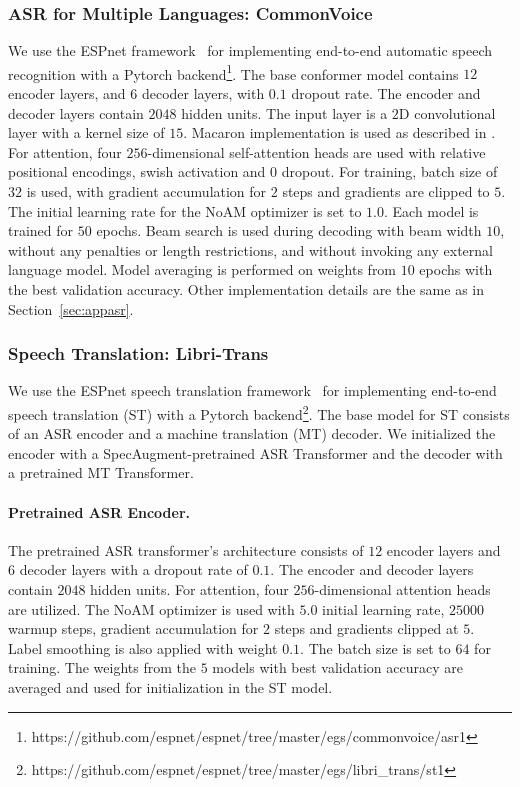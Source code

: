 \documentclass{article}
\begin{document}
\subsubsection{ASR for Multiple Languages: CommonVoice}
\label{sec:appcommon}
We use the ESPnet framework~\citep{espnet} for implementing end-to-end automatic speech recognition with a Pytorch backend\footnote{https://github.com/espnet/espnet/tree/master/egs/commonvoice/asr1}. The base conformer model contains $12$ encoder layers, and $6$ decoder layers, with $0.1$ dropout rate. The encoder and decoder layers contain $2048$ hidden units. The input layer is a $2$D convolutional layer with a kernel size of $15$. Macaron implementation is used as described in \citep{conformer,espnetconformer}. For attention, four $256$-dimensional self-attention heads are used with relative positional encodings, swish activation and $0$ dropout.  For training, batch size of $32$ is used, with gradient accumulation for $2$ steps and gradients are clipped to $5$. The initial learning rate for the NoAM optimizer is set to $1.0$. Each model is trained for $50$ epochs. Beam search is used during decoding with beam width $10$, without any penalties or length restrictions, and without invoking any external language model. Model averaging is performed on  weights from $10$ epochs with the best validation accuracy. Other implementation details are the same as in Section~\ref{sec:appasr}.

\subsubsection{Speech Translation: Libri-Trans}
We use the ESPnet speech translation framework~\citep{espnetst} for implementing end-to-end speech translation (ST) with a Pytorch backend\footnote{https://github.com/espnet/espnet/tree/master/egs/libri\_trans/st1}. The base model for ST consists of an ASR encoder and a machine translation (MT) decoder. We initialized the encoder with a SpecAugment-pretrained ASR Transformer and the decoder with a pretrained MT Transformer.

\paragraph{Pretrained ASR Encoder.} The pretrained ASR transformer's architecture consists of $12$ encoder layers and $6$ decoder layers with a dropout rate of $0.1$. The encoder and decoder layers contain $2048$ hidden units. For attention, four $256$-dimensional attention heads are utilized. The NoAM optimizer is used with $5.0$ initial learning rate, $25000$ warmup steps, gradient accumulation for $2$ steps and gradients clipped at $5$.  Label smoothing is also applied with weight $0.1$. The batch size is set to $64$ for training. The weights from the $5$ models with best validation accuracy are averaged and used for initialization in the ST model.
\end{document}
